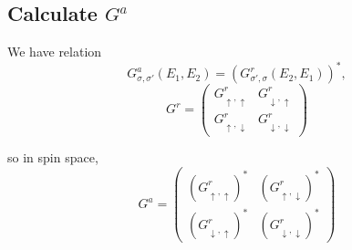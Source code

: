 \documentclass[11pt,a4paper]{article}
\begin{document}
\subsection{Calculate $G^{a}$}
We have relation
\begin{equation}
G_{\sigma,\sigma'}^{a}\left(E_{1}, E_{2}\right)=(G_{\sigma',\sigma}^{r}\left(E_{2}, E_{1}\right))^{*},
\end{equation}
\begin{equation}
G^{r}=\left(\begin{array}{cc}
G_{\uparrow,\uparrow}^{r} & G_{\downarrow,\uparrow}^{r} \\
G_{\uparrow,\downarrow}^{r} & G_{\downarrow,\downarrow}^{r}
\end{array}\right)
\end{equation}

so in spin space, 
\begin{equation}
G^{a}=\left(\begin{array}{cc}
(G_{\uparrow,\uparrow}^{r})^{*} & (G_{\uparrow,\downarrow}^{r})^{*} \\
(G_{\downarrow,\uparrow}^{r})^{*} & (G_{\downarrow,\downarrow}^{r})^{*}
\end{array}\right)
\end{equation}
\end{document}
